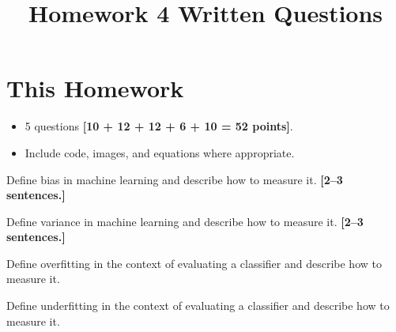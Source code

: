 \documentclass{csci1430}
\begin{document}
\title{Homework 4 Written Questions}
\maketitle
\thispagestyle{fancy}

\writeinstructions

\section*{This Homework}
\begin{itemize}
    \item 5 questions \textbf{[10 + 12 + 12 + 6 + 10 = 52 points]}.
    \item Include code, images, and equations where appropriate.
\end{itemize}


\pagebreak
\begin{question}[points=10,drawbox=false]
\end{question}

\begin{subquestion}[points=2]
Define bias in machine learning and describe how to measure it. \textbf{[2--3 sentences.]}
\end{subquestion}

\begin{answer}[height=8]

\end{answer}
    
\begin{subquestion}[points=2]
Define variance in machine learning and describe how to measure it. \textbf{[2--3 sentences.]}
\end{subquestion}

\begin{answer}[height=8]

\end{answer}
    

\pagebreak
\begin{subquestion}[points=2]
Define overfitting in the context of evaluating a classifier and describe how to measure it.
\end{subquestion}
    
\begin{answer}[height=8]

\end{answer}
    

\begin{subquestion}[points=2]
Define underfitting in the context of evaluating a classifier and describe how to measure it.
\end{subquestion}
    
\end{document}
